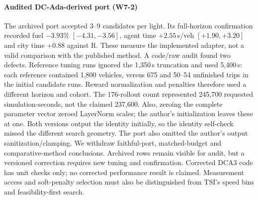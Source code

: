 \paragraph{Audited DC-Ada-derived port (W7-2)}
The archived port accepted 3--9 candidates per light. Its full-horizon confirmation recorded fuel $-3.93\%$ $[-4.31,-3.56]$, agent time $+2.55$\,s/veh $[+1.90,+3.20]$ and city time $+0.88$ against R. These measure the implemented adapter, not a valid comparison with the published method.
A code/raw audit found two defects. Reference tuning runs ignored the 1,350\,s truncation and used 5,400\,s: each reference contained 1,800 vehicles, versus 675 and 50--54 unfinished trips in the initial candidate runs. Reward normalization and penalties therefore used a different horizon and cohort. The 176-rollout count represented 245,700 requested simulation-seconds, not the claimed 237,600. Also, zeroing the complete parameter vector zeroed LayerNorm scales; the author's initialization leaves these at one. Both versions output the identity initially, so the identity self-check missed the different search geometry. The port also omitted the author's output sanitization/clamping.
We withdraw faithful-port, matched-budget and comparative-method conclusions. Archived rows remain visible for audit, but a versioned correction requires new tuning and confirmation. Corrected DCA3 code has unit checks only; no corrected performance result is claimed. Measurement access and soft-penalty selection must also be distinguished from TSI's speed bins and feasibility-first search.

